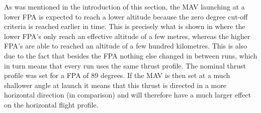 \noindent
As was mentioned in the introduction of this section, the \ac{MAV} launching at a lower \ac{FPA} is expected to reach a lower altitude because the zero degree cut-off criteria is reached earlier in time. This is precisely what is shown in  where the lower \ac{FPA}'s only reach an effective altitude of a few metres, whereas the higher \ac{FPA}'s are able to reached an altitude of a few hundred kilometres. This is also due to the fact that besides the \ac{FPA} nothing else changed in between runs, which in turn means that every run uses the same thrust profile. The nominal thrust profile was set for a \ac{FPA} of 89 degrees. If the \ac{MAV} is then set at a much shallower angle at launch it means that this thrust is directed in a more horizontal direction (in comparison) and will therefore have a much larger effect on the horizontal flight profile.


